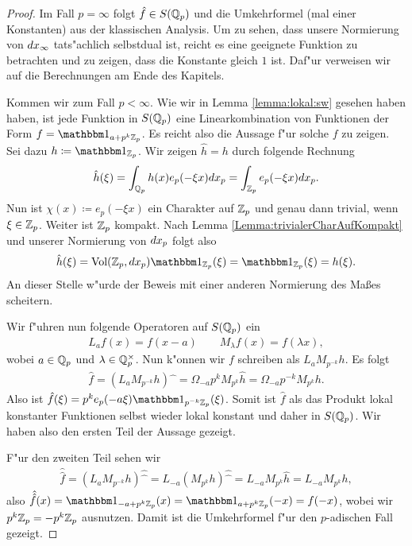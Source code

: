 		\begin{proof}
			Im Fall $p=\infty$ folgt $\hat{f} \in S({\mathbb{Q}_p})$ und die Umkehrformel (mal einer Konstanten) aus der klassischen Analysis.
			Um zu sehen, dass unsere Normierung von $d{x}_\infty$ tats"achlich selbstdual ist, reicht es eine geeignete Funktion zu betrachten und zu zeigen, dass die Konstante gleich $1$ ist. 
			Daf"ur verweisen wir auf die Berechnungen am Ende des Kapitels.
			
			Kommen wir zum Fall $p<\infty$. 
			Wie wir in Lemma \ref{lemma:lokal:sw} gesehen haben haben, ist jede Funktion in $S({\mathbb{Q}_p})$ eine Linearkombination von Funktionen der Form $f = \ind_{a+p^k\Zp}$. 
			Es reicht also die Aussage f"ur solche $f$ zu zeigen.
			Sei dazu $h\coloneqq  \ind_{\Zp}$. Wir zeigen $\hat{h} = h$ durch folgende Rechnung
			\begin{align*}
				\hat{h}(\xi) = \int_{\mathbb{Q}_p} h(x) e_p (-\xi x) d{x}_p = \int_{\mathbb{Z}_p} e_p(-\xi x) d{x}_p.
			\end{align*}
			Nun ist $\chi(x)\coloneqq e_p(-\xi x)$ ein Charakter auf ${\mathbb{Z}_p}$ und genau dann trivial, wenn $\xi\in{\mathbb{Z}_p}$. 
			Weiter ist ${\mathbb{Z}_p}$ kompakt. 
			Nach Lemma \ref{Lemma:trivialerCharAufKompakt} und unserer Normierung von $d{x}_p$ folgt also
			\begin{align*}
				\hat{h}(\xi) = \Vol(\Zp, \dxp) \ind_\Zp(\xi) = \ind_\Zp(\xi) = h(\xi).
			\end{align*}
			An dieser Stelle w"urde der Beweis mit einer anderen Normierung des Maßes scheitern.
			
			Wir f"uhren nun folgende Operatoren auf $S({\mathbb{Q}_p})$ ein
			\begin{align*}
				L_a f(x) = f(x-a)\qquad M_\lambda f(x) = f(\lambda x),
			\end{align*}
			wobei $a \in {\mathbb{Q}_p}$ und $\lambda \in \mathbb{Q}_p^\times$. 
			Nun k"onnen wir $f$ schreiben als $L_a M_{p^{-k}}h$. 
			Es folgt
			\begin{align*}
				\hat{f} = (L_a M_{p^{-k}}h)\widehat{\phantom{x}} = \Omega_{-a}p^{k}M_{p^k}\hat{h}=\Omega_{-a}p^{-k}M_{p^k}h.
			\end{align*}
			Also ist $\hat{f} (\xi) = p^k e_p(-a\xi)\ind_{p^{-k}\Zp}(\xi)$. 
			Somit ist $\hat{f}$ als das Produkt lokal konstanter Funktionen selbst wieder lokal konstant und daher in $S({\mathbb{Q}_p})$. 
			Wir haben also den ersten Teil der Aussage gezeigt.
			
			F"ur den zweiten Teil sehen wir
			\begin{align*}
				\hat{\hat{f}} = (L_a M_{p^{-k}}h)\widehat{\widehat{\phantom{x}}} = L_{-a} (M_{p^k}h)\widehat{\widehat{\phantom{x}}}=L_{-a}M_{p^k}\hat{h} =L_{-a}M_{p^k}h,
			\end{align*}
			also $\hat{\hat{f}} (x) = \ind_{-a+p^k\Zp} (x) = \ind_{a+p^k\Zp} (-x) = f(-x)$, wobei wir $p^k{\mathbb{Z}_p} = - p^k{\mathbb{Z}_p}$ ausnutzen. 
			Damit ist die Umkehrformel f"ur den $p$-adischen Fall gezeigt. 
		\end{proof}
		
